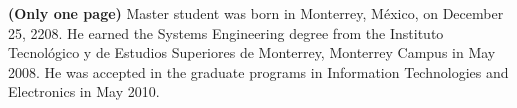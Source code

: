 \textbf{(Only one page)} Master student was born in Monterrey, M\'{e}xico, on December 25, 2208. He earned the Systems Engineering degree from the Instituto Tecnológico y de Estudios Superiores de Monterrey, Monterrey Campus in May 2008. He was accepted in the graduate programs in Information Technologies and Electronics in May 2010.